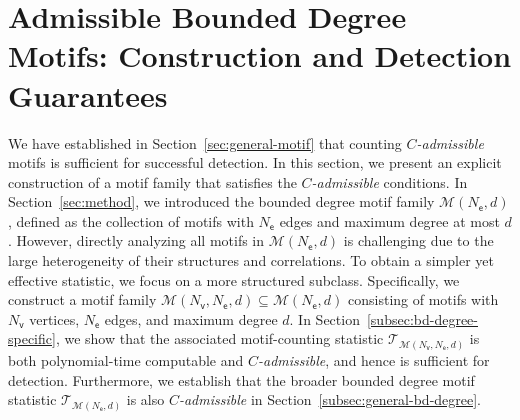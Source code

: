 \documentclass[letterpaper,11pt]{article}
\theoremstyle{definition}
\newcommand{\maM}{\mathcal{M}}
\newcommand{\maT}{\mathcal{T}}
\newcommand{\nbr}[1]{{\sf\color{red}[#1]}}
\newcommand{\en}{\mathsf{{e}}}
\newcommand{\vn}{\mathsf{{v}}}
\newcommand{\sfM}{{\mathsf{M}}}
\newcommand{\sfe}{{\mathsf{e}}}
\newcommand{\sfv}{{\mathsf{v}}}
\begin{document}




\section{Admissible Bounded Degree Motifs: Construction and Detection Guarantees}\label{sec:bd-sub-count}
We have established in Section~\ref{sec:general-motif} that counting \emph{$C$-admissible} motifs is sufficient for successful detection. In this section, we present an explicit construction of a motif family that satisfies the \emph{$C$-admissible} conditions.
In Section~\ref{sec:method}, we introduced the bounded degree motif family $\maM(N_\sfe, d)$, defined as the collection of motifs with $N_\sfe$ edges and maximum degree at most $d$. However, directly analyzing all motifs in $\maM(N_\sfe, d)$ is challenging due to the large heterogeneity of their structures and correlations. To obtain a simpler yet effective statistic, we focus on a more structured subclass.
Specifically, we construct a motif family $\maM(N_\sfv, N_\sfe, d) \subseteq \maM(N_\sfe, d)$ consisting of motifs with $N_\sfv$ vertices, $N_\sfe$ edges, and maximum degree $d$. In Section~\ref{subsec:bd-degree-specific}, we show that the associated motif-counting statistic $\maT_{\maM(N_\sfv, N_\sfe, d)}$ is both polynomial-time computable and \emph{$C$-admissible}, and hence is sufficient for detection. Furthermore, we establish that the broader bounded degree motif statistic $\maT_{\maM(N_\sfe, d)}$ is also \emph{$C$-admissible} in Section~\ref{subsec:general-bd-degree}.
\end{document}
